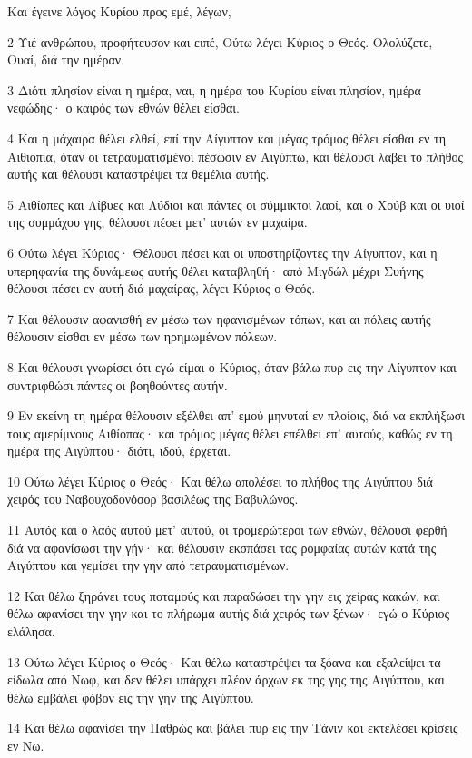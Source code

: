 \par Και έγεινε λόγος Κυρίου προς εμέ, λέγων,
\par 2 Υιέ ανθρώπου, προφήτευσον και ειπέ, Ούτω λέγει Κύριος ο Θεός. Ολολύζετε, Ουαί, διά την ημέραν.
\par 3 Διότι πλησίον είναι η ημέρα, ναι, η ημέρα του Κυρίου είναι πλησίον, ημέρα νεφώδης· ο καιρός των εθνών θέλει είσθαι.
\par 4 Και η μάχαιρα θέλει ελθεί, επί την Αίγυπτον και μέγας τρόμος θέλει είσθαι εν τη Αιθιοπία, όταν οι τετραυματισμένοι πέσωσιν εν Αιγύπτω, και θέλουσι λάβει το πλήθος αυτής και θέλουσι καταστρέψει τα θεμέλια αυτής.
\par 5 Αιθίοπες και Λίβυες και Λύδιοι και πάντες οι σύμμικτοι λαοί, και ο Χούβ και οι υιοί της συμμάχου γης, θέλουσι πέσει μετ' αυτών εν μαχαίρα.
\par 6 Ούτω λέγει Κύριος· Θέλουσι πέσει και οι υποστηρίζοντες την Αίγυπτον, και η υπερηφανία της δυνάμεως αυτής θέλει καταβληθή· από Μιγδώλ μέχρι Συήνης θέλουσι πέσει εν αυτή διά μαχαίρας, λέγει Κύριος ο Θεός.
\par 7 Και θέλουσιν αφανισθή εν μέσω των ηφανισμένων τόπων, και αι πόλεις αυτής θέλουσιν είσθαι εν μέσω των ηρημωμένων πόλεων.
\par 8 Και θέλουσι γνωρίσει ότι εγώ είμαι ο Κύριος, όταν βάλω πυρ εις την Αίγυπτον και συντριφθώσι πάντες οι βοηθούντες αυτήν.
\par 9 Εν εκείνη τη ημέρα θέλουσιν εξέλθει απ' εμού μηνυταί εν πλοίοις, διά να εκπλήξωσι τους αμερίμνους Αιθίοπας· και τρόμος μέγας θέλει επέλθει επ' αυτούς, καθώς εν τη ημέρα της Αιγύπτου· διότι, ιδού, έρχεται.
\par 10 Ούτω λέγει Κύριος ο Θεός· Και θέλω απολέσει το πλήθος της Αιγύπτου διά χειρός του Ναβουχοδονόσορ βασιλέως της Βαβυλώνος.
\par 11 Αυτός και ο λαός αυτού μετ' αυτού, οι τρομερώτεροι των εθνών, θέλουσι φερθή διά να αφανίσωσι την γήν· και θέλουσιν εκσπάσει τας ρομφαίας αυτών κατά της Αιγύπτου και γεμίσει την γην από τετραυματισμένων.
\par 12 Και θέλω ξηράνει τους ποταμούς και παραδώσει την γην εις χείρας κακών, και θέλω αφανίσει την γην και το πλήρωμα αυτής διά χειρός των ξένων· εγώ ο Κύριος ελάλησα.
\par 13 Ούτω λέγει Κύριος ο Θεός· Και θέλω καταστρέψει τα ξόανα και εξαλείψει τα είδωλα από Νωφ, και δεν θέλει υπάρχει πλέον άρχων εκ της γης της Αιγύπτου, και θέλω εμβάλει φόβον εις την γην της Αιγύπτου.
\par 14 Και θέλω αφανίσει την Παθρώς και βάλει πυρ εις την Τάνιν και εκτελέσει κρίσεις εν Νω.
